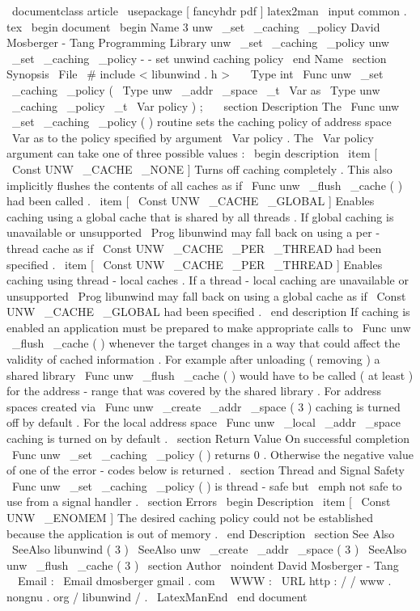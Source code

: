 \
documentclass
{
article
}
\
usepackage
[
fancyhdr
pdf
]
{
latex2man
}
\
input
{
common
.
tex
}
\
begin
{
document
}
\
begin
{
Name
}
{
3
}
{
unw
\
_set
\
_caching
\
_policy
}
{
David
Mosberger
-
Tang
}
{
Programming
Library
}
{
unw
\
_set
\
_caching
\
_policy
}
unw
\
_set
\
_caching
\
_policy
-
-
set
unwind
caching
policy
\
end
{
Name
}
\
section
{
Synopsis
}
\
File
{
\
#
include
<
libunwind
.
h
>
}
\
\
\
Type
{
int
}
\
Func
{
unw
\
_set
\
_caching
\
_policy
}
(
\
Type
{
unw
\
_addr
\
_space
\
_t
}
\
Var
{
as
}
\
Type
{
unw
\
_caching
\
_policy
\
_t
}
\
Var
{
policy
}
)
;
\
\
\
section
{
Description
}
The
\
Func
{
unw
\
_set
\
_caching
\
_policy
}
(
)
routine
sets
the
caching
policy
of
address
space
\
Var
{
as
}
to
the
policy
specified
by
argument
\
Var
{
policy
}
.
The
\
Var
{
policy
}
argument
can
take
one
of
three
possible
values
:
\
begin
{
description
}
\
item
[
\
Const
{
UNW
\
_CACHE
\
_NONE
}
]
Turns
off
caching
completely
.
This
also
implicitly
flushes
the
contents
of
all
caches
as
if
\
Func
{
unw
\
_flush
\
_cache
}
(
)
had
been
called
.
\
item
[
\
Const
{
UNW
\
_CACHE
\
_GLOBAL
}
]
Enables
caching
using
a
global
cache
that
is
shared
by
all
threads
.
If
global
caching
is
unavailable
or
unsupported
\
Prog
{
libunwind
}
may
fall
back
on
using
a
per
-
thread
cache
as
if
\
Const
{
UNW
\
_CACHE
\
_PER
\
_THREAD
}
had
been
specified
.
\
item
[
\
Const
{
UNW
\
_CACHE
\
_PER
\
_THREAD
}
]
Enables
caching
using
thread
-
local
caches
.
If
a
thread
-
local
caching
are
unavailable
or
unsupported
\
Prog
{
libunwind
}
may
fall
back
on
using
a
global
cache
as
if
\
Const
{
UNW
\
_CACHE
\
_GLOBAL
}
had
been
specified
.
\
end
{
description
}
If
caching
is
enabled
an
application
must
be
prepared
to
make
appropriate
calls
to
\
Func
{
unw
\
_flush
\
_cache
}
(
)
whenever
the
target
changes
in
a
way
that
could
affect
the
validity
of
cached
information
.
For
example
after
unloading
(
removing
)
a
shared
library
\
Func
{
unw
\
_flush
\
_cache
}
(
)
would
have
to
be
called
(
at
least
)
for
the
address
-
range
that
was
covered
by
the
shared
library
.
For
address
spaces
created
via
\
Func
{
unw
\
_create
\
_addr
\
_space
}
(
3
)
caching
is
turned
off
by
default
.
For
the
local
address
space
\
Func
{
unw
\
_local
\
_addr
\
_space
}
caching
is
turned
on
by
default
.
\
section
{
Return
Value
}
On
successful
completion
\
Func
{
unw
\
_set
\
_caching
\
_policy
}
(
)
returns
0
.
Otherwise
the
negative
value
of
one
of
the
error
-
codes
below
is
returned
.
\
section
{
Thread
and
Signal
Safety
}
\
Func
{
unw
\
_set
\
_caching
\
_policy
}
(
)
is
thread
-
safe
but
\
emph
{
not
}
safe
to
use
from
a
signal
handler
.
\
section
{
Errors
}
\
begin
{
Description
}
\
item
[
\
Const
{
UNW
\
_ENOMEM
}
]
The
desired
caching
policy
could
not
be
established
because
the
application
is
out
of
memory
.
\
end
{
Description
}
\
section
{
See
Also
}
\
SeeAlso
{
libunwind
(
3
)
}
\
SeeAlso
{
unw
\
_create
\
_addr
\
_space
(
3
)
}
\
SeeAlso
{
unw
\
_flush
\
_cache
(
3
)
}
\
section
{
Author
}
\
noindent
David
Mosberger
-
Tang
\
\
Email
:
\
Email
{
dmosberger
gmail
.
com
}
\
\
WWW
:
\
URL
{
http
:
/
/
www
.
nongnu
.
org
/
libunwind
/
}
.
\
LatexManEnd
\
end
{
document
}
